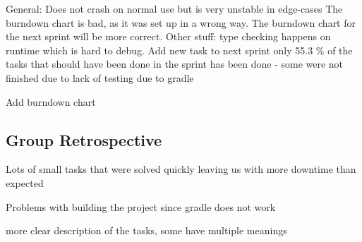 General:
Does not crash on normal use but is very unstable in edge-cases
The burndown chart is bad, as it was set up in a wrong way. The burndown chart for the next sprint will be more correct.
Other stuff:
type checking happens on runtime which is hard to debug.
Add new task to next sprint
only 55.3 \% of the tasks that should have been done in the sprint has been
done - some were not finished due to lack of testing due to gradle

Add burndown chart


\subsection{Group Retrospective}

Lots of small tasks that were solved quickly leaving us with more downtime than
expected

Problems with building the project since gradle does not work

more clear description of the tasks, some have multiple meanings
